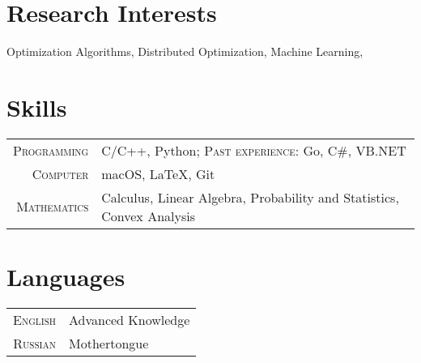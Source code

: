 \documentclass[a4paper,10pt]{article} %
\begin{document}
\section{Research Interests}
 Optimization Algorithms, Distributed Optimization, Machine Learning, 



\section{Skills}

\begin{tabular}{rl}
	\textsc{Programming} & C/C++, Python; \textsc{Past experience:} Go, C\#, VB.NET\\
	\textsc{Computer} & macOS, LaTeX, Git\\
	\textsc{Mathematics} & Calculus, Linear Algebra, Probability and Statistics, Convex Analysis\\
\end{tabular}

\section{Languages}

\begin{tabular}{rl}
\textsc{English} & Advanced Knowledge \\
\textsc{Russian} & Mothertongue\\
\end{tabular}
\end{document}
